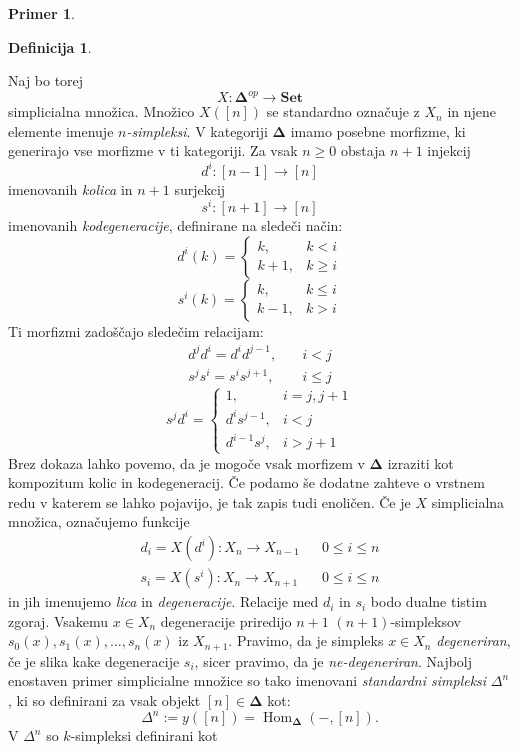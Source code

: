 \documentclass[12pt,a4paper]{book}
\theoremstyle{definition}
\newtheorem{definicija}{Definicija}[chapter]
\theoremstyle{plain}
\theoremstyle{definition}
\newtheorem{primer}{Primer}[section]
\theoremstyle{remark}
\newcommand{\cat}[1]{\textbf{#1}}
\DeclareMathOperator{\Hom}{Hom}
\begin{document}
\begin{primer}
\begin{definicija}
\end{definicija}
Naj bo torej
$$X : \mathbf{\Delta}^{op} \to \cat{Set}$$
simplicialna množica. Množico $X([n])$ se standardno označuje z $X_n$ in njene elemente imenuje \emph{$n$-simpleksi}. 
V kategoriji $\mathbf{\Delta}$ imamo posebne morfizme, ki generirajo vse morfizme v ti kategoriji. Za vsak $n \geq 0$ obstaja $n+1$ injekcij 
$$d^i : [n-1] \to [n]$$ 
imenovanih \emph{kolica} in $n+1$ surjekcij 
$$s^i : [n+1] \to [n]$$
imenovanih \emph{kodegeneracije}, definirane na sledeči način:
%
$$d^i(k) = \begin{cases}
k, & k < i \\
k+1, & k \geq i 
\end{cases} $$
$$s^i(k) = \begin{cases}
k, & k \leq i \\
k-1, & k > i
\end{cases} $$
Ti morfizmi zadoščajo sledečim relacijam:
\begin{align*}
d^j d^i = d^i d^{j-1}, & \quad i < j \\
s^j s^i = s^i s^{j+1}, & \quad i \leq j 
\end{align*}
$$ s^j d^i = \begin{cases}
1, & i = j, j+1 \\
d^i s^{j-1}, & i < j \\
d^{i-1} s^j, & i > j+1
\end{cases} $$
%
Brez dokaza lahko povemo, da je mogoče vsak morfizem v $\mathbf{\Delta}$ izraziti kot kompozitum kolic in kodegeneracij. Če podamo še dodatne zahteve o vrstnem redu v katerem se lahko pojavijo, je tak zapis tudi enoličen.
%
Če je $X$ simplicialna množica, označujemo funkcije
\begin{align*}
d_i = X(d^i) : X_n \to X_{n-1} & & 0 \leq i \leq n \\
s_i = X(s^i) : X_n \to X_{n+1} & & 0 \leq i \leq n
\end{align*}
in jih imenujemo \emph{lica} in \emph{degeneracije}. Relacije med $d_i$ in $s_i$ bodo dualne tistim zgoraj.
Vsakemu $x \in X_n$ degeneracije priredijo $n+1$ $(n+1)$-simpleksov $s_0(x), s_1(x), \ldots , s_n(x)$ iz  $X_{n+1}$. Pravimo, da je simpleks $x \in X_n$ \emph{degeneriran}, če je slika kake degeneracije $s_i$, sicer pravimo, da je \emph{ne-degeneriran}.
%
Najbolj enostaven primer simplicialne množice so tako imenovani \emph{standardni simpleksi} $\Delta^n$, ki so definirani za vsak objekt $[n] \in \mathbf{\Delta}$ kot:
$$\Delta^n := y([n]) = \Hom_{\mathbf{\Delta}}(-,[n]).$$
V $\Delta^n$ so $k$-simpleksi definirani kot

\end{primer}
\end{document}

